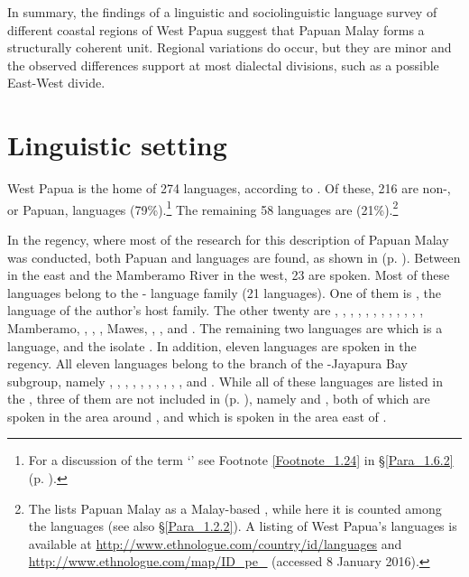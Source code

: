 In summary, the findings of a linguistic and sociolinguistic language survey of different coastal regions of West Papua suggest that Papuan Malay forms a structurally coherent unit. Regional variations do occur, but they are minor and the observed differences support at most dialectal divisions, such as a possible East-West divide.

\section{Linguistic setting}\label{Para_1.4}
West Papua is the home of 274 languages, according to \citet{Lewis.2016}. Of these, 216 are non-, or Papuan, languages (79\%).\footnote{For a discussion of the term ‘’ see Footnote \ref{Footnote_1.24} in §\ref{Para_1.6.2} (p. \pageref{Footnote_1.24}).}
 The remaining 58 languages are  (21\%).\footnote{The  \citep{Lewis.2016} lists Papuan Malay as a Malay-based , while here it is counted among the  languages (see also §\ref{Para_1.2.2}). A listing of West Papua’s languages is available at \url{http://www.ethnologue.com/country/id/languages} and \url{http://www.ethnologue.com/map/ID_pe_} (accessed 8 January 2016).}


In the  regency, where most of the research for this description of Papuan Malay was conducted, both Papuan and  languages are found, as shown in  (p. \pageref{Figure_0.3}). Between  in the east and the Mamberamo River in the west, 23  are spoken. Most of these languages belong to the - language family (21 languages). One of them is , the language of the author’s host family. The other twenty  are , , , , , , , , , , , ,  Mamberamo, , , , Maw\-es, , , and . The remaining two languages are  which is a  language, and the isolate . In addition, eleven  languages are spoken in the  regency. All eleven languages belong to the  branch of the -Jayapura Bay subgroup, namely , , , , , , , , , , and . While all of these languages are listed in the  \citep{Lewis.2016}, three of them are not included in  (p. \pageref{Figure_0.3}), namely  and , both of which are spoken in the area around , and  which is spoken in the area east of .

